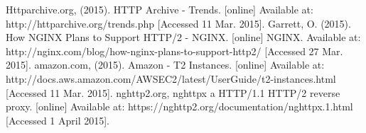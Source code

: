 \begin{thebibliography}{99}
 Httparchive.org, (2015). HTTP Archive - Trends. [online] Available at: http://httparchive.org/trends.php [Accessed 11 Mar. 2015].
Garrett, O. (2015). How NGINX Plans to Support HTTP/2 - NGINX. [online] NGINX. Available at: http://nginx.com/blog/how-nginx-plans-to-support-http2/ [Accessed 27 Mar. 2015].
 amazon.com, (2015). Amazon - T2 Instances. [online] Available at: http://docs.aws.amazon.com/AWSEC2/latest/UserGuide/t2-instances.html [Accessed 11 Mar. 2015].
 nghttp2.org, nghttpx a HTTP/1.1 HTTP/2 reverse proxy. [online] Available at: https://nghttp2.org/documentation/nghttpx.1.html [Accessed 1 April 2015].
\end{thebibliography}